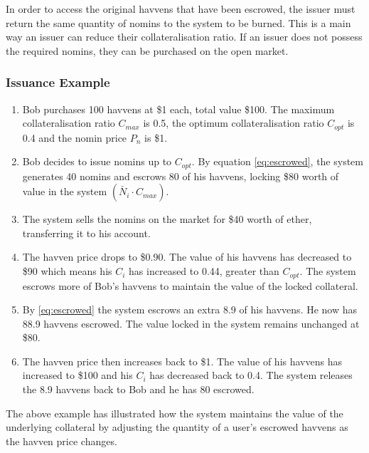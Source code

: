 \noindent In order to access the original havvens that have been escrowed, the issuer must return the same quantity of nomins to the system to be burned. This is a main way 
an issuer can reduce their collateralisation ratio. If an issuer does not possess the required nomins, they can be purchased on the open market.

\subsubsection{Issuance Example}

\begin{enumerate}
\item{Bob purchases 100 havvens at \$1 each, total value \$100. The maximum collateralisation ratio $C_{max}$ is 0.5, the optimum collateralisation ratio $C_{opt}$ is 0.4 and the nomin price $P_n$ is \$1.}
\item{Bob decides to issue nomins up to $C_{opt}$. By equation \eqref{eq:escrowed}, the system generates 40 nomins and escrows 80 of his havvens, locking \$80 worth of value in the system $ (\check{N_i} \cdot C_{max})$.}
\item{The system sells the nomins on the market for \$40 worth of ether, transferring it to his account}.
\item{The havven price drops to \$0.90. The value of his havvens has decreased to \$90 which means his $C_i$ has increased to 0.44, greater than $C_{opt}$. The system escrows more of Bob's havvens to maintain the value of the locked collateral.}
\item{By \eqref{eq:escrowed} the system escrows an extra 8.9 of his havvens. He now has 88.9 havvens escrowed. The value locked in the system remains unchanged at \$80.}
\item{The havven price then increases back to \$1. The value of his havvens has increased to \$100 and his $C_i$ has decreased back to 0.4. The system releases the 8.9 havvens back to Bob and he has 80 escrowed.}
\end{enumerate}

\noindent The above example has illustrated how the system maintains the value of the underlying collateral by adjusting the quantity of a user's escrowed havvens as the havven price changes.


